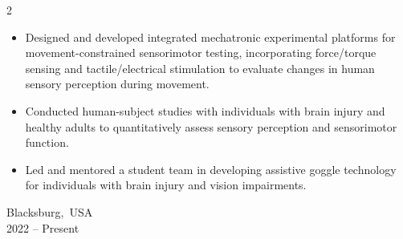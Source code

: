 \documentclass[10pt, letterpaper]{article}
\newenvironment{highlights}{
    \begin{itemize}[
        topsep=0.10 cm,
        parsep=0.10 cm,
        partopsep=0pt,
        itemsep=0pt,
        leftmargin=0.2 cm + 10pt
    ]
}{
    \end{itemize}
} %
\newenvironment{twocolentry}[2][]{
    \onecolentry
    \def\secondColumn{#2}
    \setcolumnwidth{\fill, 2.8 cm}
    \begin{paracol}{2}
}{
    \switchcolumn \raggedleft \secondColumn
    \end{paracol}
    \endonecolentry
} %
\begin{document}
\begin{twocolentry}{
            Blacksburg,~USA\\
        2022 – Present
        }
\begin{highlights}
                \item Designed and developed integrated mechatronic experimental platforms for movement-constrained sensorimotor testing, incorporating force/torque sensing and tactile/electrical stimulation to evaluate changes in human sensory perception during movement.
                \item Conducted human-subject studies with individuals with brain injury and healthy adults to quantitatively assess sensory perception and sensorimotor function. 
                \item Led and mentored a student team in developing assistive goggle technology for individuals with brain injury and vision impairments.
            \end{highlights}
        \end{twocolentry}
\end{document}
